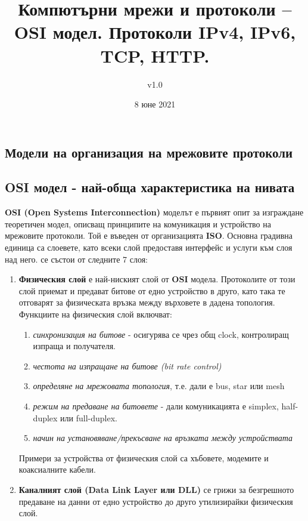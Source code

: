 \documentclass[fleqn,12pt]{article}
\title{Компютърни мрежи и протоколи – OSI модел. Протоколи IPv4,  IPv6, TCP, HTTP.}
\author{v1.0}
\date{8 юне 2021}
\begin{document}
\maketitle

\tableofcontents
\pagebreak

\begin{flushleft}

\section{Модели на организация на мрежовите протоколи}
\subsection{OSI модел - най-обща характеристика на нивата}
\textbf{OSI (Open Systems Interconnection)} моделът е първият опит за изграждане теоретичен модел, описващ принципите на комуникация и устройство на мрежовите протоколи.
Той е въведен от организацията \textbf{ISO}. Основна градивна единица са слоевете, като всеки слой предоставя интерфейс и услуги към слоя над него.  се състои от следните 7 слоя:
\begin{enumerate}
    \item \textbf{Физическия слой} е най-ниският слой от \textbf{OSI} модела. Протоколите от този слой приемат и предават битове от едно устройство в друго, като така те отговарят за
    физическата връзка между върховете в дадена топология. Функциите на физическия слой включват:
    \begin{enumerate}
        \item \textit{синхронизация на битове} - осигурява се чрез общ clock, контролиращ изпраща и получателя.
        \item \textit{честота на изпращане на битове (bit rate control)}
        \item \textit{определяне на мрежовата топология}, т.е. дали е bus, star или mesh
        \item \textit{режим на предаване на битовете} - дали комуникацията е simplex, half-duplex или full-duplex.
        \item \textit{начин на установяване/прекъсване на връзката между устройствата}
    \end{enumerate}
    Примери за устройства от физическия слой са хъбовете, модемите и коаксиалните кабели.
    \item \textbf{Каналният слой (Data Link Layer или DLL)} се грижи за безгрешното предаване на данни от едно устройство до друго утилизирайки физическия слой.

\end{enumerate}
\end{flushleft}
\end{document}

